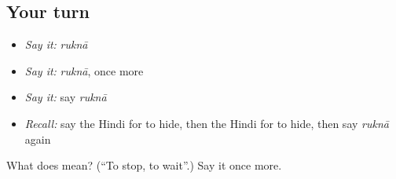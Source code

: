\subsection*{Your turn}
\begin{itemize}
\raggedright
  \item \emph{Say it:} \emph{ruknā}
  \item \emph{Say it:} \emph{ruknā}, once more
  \item \emph{Say it:} say \emph{ruknā}
  \item \emph{Recall:} say the Hindi for to hide, then the Hindi for to hide, then say \emph{ruknā} again
\end{itemize}

\begin{tcolorbox}[breakable,colback=teal!4,colframe=teal!35!black,title={Before you move on}]
What does  mean? (\textquotedblleft{}To stop, to wait\textquotedblright{}.) Say it once more.
\end{tcolorbox}
